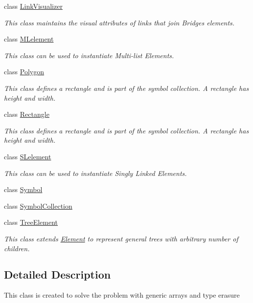 \begin{DoxyCompactItemize}
class \mbox{\hyperlink{classbridges_1_1base_1_1_link_visualizer}{Link\+Visualizer}}
\begin{DoxyCompactList}\small\item\em This class maintains the visual attributes of links that join Bridges elements. \end{DoxyCompactList}\item 
class \mbox{\hyperlink{classbridges_1_1base_1_1_m_lelement}{M\+Lelement}}
\begin{DoxyCompactList}\small\item\em This class can be used to instantiate Multi-\/list Elements. \end{DoxyCompactList}\item 
class \mbox{\hyperlink{classbridges_1_1base_1_1_polygon}{Polygon}}
\begin{DoxyCompactList}\small\item\em This class defines a rectangle and is part of the symbol collection. A rectangle has height and width. \end{DoxyCompactList}\item 
class \mbox{\hyperlink{classbridges_1_1base_1_1_rectangle}{Rectangle}}
\begin{DoxyCompactList}\small\item\em This class defines a rectangle and is part of the symbol collection. A rectangle has height and width. \end{DoxyCompactList}\item 
class \mbox{\hyperlink{classbridges_1_1base_1_1_s_lelement}{S\+Lelement}}
\begin{DoxyCompactList}\small\item\em This class can be used to instantiate Singly Linked Elements. \end{DoxyCompactList}\item 
class \mbox{\hyperlink{classbridges_1_1base_1_1_symbol}{Symbol}}
\item 
class \mbox{\hyperlink{classbridges_1_1base_1_1_symbol_collection}{Symbol\+Collection}}
\item 
class \mbox{\hyperlink{classbridges_1_1base_1_1_tree_element}{Tree\+Element}}
\begin{DoxyCompactList}\small\item\em This class extends \mbox{\hyperlink{classbridges_1_1base_1_1_element}{Element}} to represent general trees with arbitrary number of children. \end{DoxyCompactList}\end{DoxyCompactItemize}


\subsection{Detailed Description}
This class is created to solve the problem with generic arrays and type erasure 